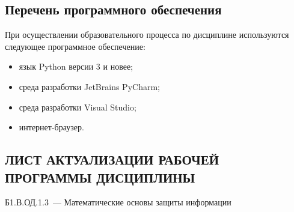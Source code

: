 \documentclass[a4paper,12pt]{article}
\begin{document}
\subsection{Перечень программного обеспечения}
При осуществлении образовательного процесса по дисциплине используются следующее программное обеспечение:
\begin{itemize}[nolistsep]
  
\item язык Python версии 3 и новее;
  
\item среда разработки JetBrains PyCharm;
  
\item среда разработки Visual Studio;
  
\item интернет-браузер.
  
\end{itemize}



\newpage
\begin{center}
\section*{ЛИСТ АКТУАЛИЗАЦИИ РАБОЧЕЙ ПРОГРАММЫ ДИСЦИПЛИНЫ}
Б1.В.ОД.1.3\ --- Математические основы защиты информации 
\end{center}
\end{document}
